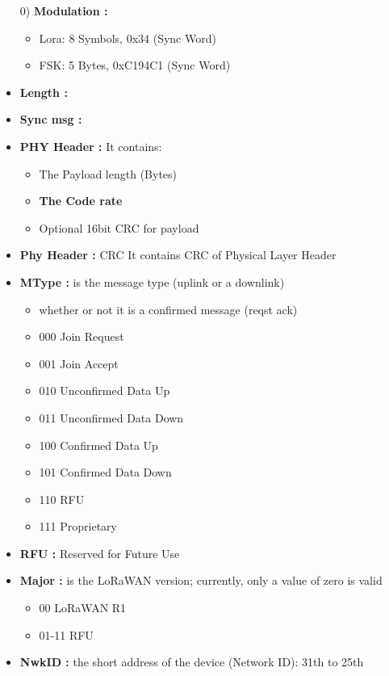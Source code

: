 \begin{landscape}
\scriptsize
\begin{multicols}{2}
\begin{itemize}
	\item[0)] \textbf{Modulation :}
	\begin{itemize}
		\item Lora:  8 Symbols, 0x34 (Sync Word)
		\item FSK:  5 Bytes, 0xC194C1 (Sync Word)
	\end{itemize}
\end{itemize}
\begin{itemize}
	\item \textbf{Length :}
	\item \textbf{Sync msg :}
	\item \textbf{PHY Header :}  It contains:
	\begin{itemize}
		\item The Payload length (Bytes)
		\item \textbf{The Code rate}
		\item Optional 16bit CRC for payload 
	\end{itemize}
	\item \textbf{Phy Header :} CRC  It contains CRC of Physical Layer Header
	\item \textbf{MType :}  is the message type (uplink or a downlink)
	\begin{itemize}
		\item whether or not it is a confirmed message (reqst ack)
		\item 000 	Join Request
		\item 001 	Join Accept
		\item 010 	Unconfirmed Data Up
		\item 011 	Unconfirmed Data Down
		\item 100 	Confirmed Data Up
		\item 101 	Confirmed Data Down
		\item 110 	RFU
		\item 111 	Proprietary
	\end{itemize}
	\item \textbf{RFU :} Reserved for Future Use
	\item \textbf{Major :}  is the LoRaWAN version; currently, only a value of zero is valid
	\begin{itemize}
		\item 00 	LoRaWAN R1
		\item 01-11 	RFU
	\end{itemize}
	\item \textbf{NwkID :} the short address of the device (Network ID): 31th to 25th

\end{itemize}
\end{multicols}
\end{landscape}
